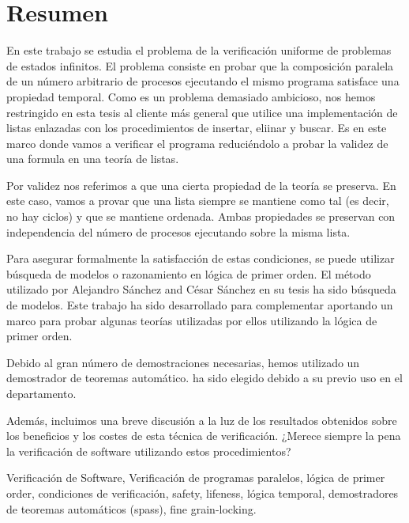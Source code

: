 \chapter*{Resumen}

\begin{abstractEs}
En este trabajo se estudia el problema de la verificación uniforme de problemas de estados infinitos.
%
El problema consiste en probar que la composición paralela de un número arbitrario de procesos ejecutando el mismo programa satisface una propiedad temporal. 
%
Como es un problema demasiado ambicioso, nos hemos restringido en esta tesis al cliente más general que utilice una implementación de listas enlazadas con los procedimientos de insertar, eliinar y buscar. 
%
Es en este marco donde vamos a verificar el programa reduciéndolo a probar la validez de una formula en una teoría de listas.

Por validez nos referimos a que una cierta propiedad de la teoría se preserva. 
%
En este caso, vamos a provar que una lista siempre se mantiene como tal (es decir, no hay ciclos) y que se mantiene ordenada.
%
Ambas propiedades se preservan con independencia del número de procesos ejecutando sobre la misma lista.

Para asegurar formalmente la satisfacción de estas condiciones, se puede utilizar búsqueda de modelos o razonamiento en lógica de primer orden. 
%
El método utilizado por Alejandro Sánchez and César Sánchez en su tesis  ha sido búsqueda de modelos. 
%
Este trabajo ha sido desarrollado para complementar  aportando un marco para probar algunas teorías utilizadas por ellos utilizando la lógica de primer orden.

Debido al gran número de demostraciones necesarias, hemos utilizado un demostrador de teoremas automático.  ha sido elegido debido a su previo uso en el departamento.

Además, incluimos una breve discusión a la luz de los resultados obtenidos sobre los beneficios y los costes de esta técnica de verificación. ¿Merece siempre la pena la verificación de software utilizando estos procedimientos?


\end{abstractEs}

\begin{keywordsEs}
Verificación de Software, Verificación de programas paralelos, lógica de primer order, condiciones de verificación, safety, lifeness, lógica temporal, demostradores de teoremas automáticos (spass), fine grain-locking.
\end{keywordsEs}
